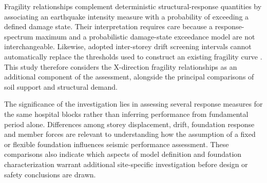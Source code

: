 Fragility relationships complement deterministic structural-response quantities by associating an earthquake intensity measure with a probability of exceeding a defined damage state. Their interpretation requires care because a response-spectrum maximum and a probabilistic damage-state exceedance model are not interchangeable. Likewise, adopted inter-storey drift screening intervals cannot automatically replace the thresholds used to construct an existing fragility curve \cite{giordano2021,adhikari2022,fema356}. This study therefore considers the X-direction fragility relationships as an additional component of the assessment, alongside the principal comparisons of soil support and structural demand.

The significance of the investigation lies in assessing several response measures for the same hospital blocks rather than inferring performance from fundamental period alone. Differences among storey displacement, drift, foundation response and member forces are relevant to understanding how the assumption of a fixed or flexible foundation influences seismic performance assessment. These comparisons also indicate which aspects of model definition and foundation characterization warrant additional site-specific investigation before design or safety conclusions are drawn.
